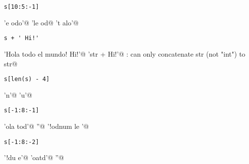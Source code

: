 \begin{ejercicio}
\begin{Verbatim}
s[10:5:-1]
\end{Verbatim}


\begin{choices}
    \choice \verb@'e odo'@
    \choice \verb@'le od@
    \choice \verb@'t alo'@
    \choice \verb@IndexError@
\end{choices}
\end{ejercicio}


\begin{ejercicio}
\begin{Verbatim}
s + ' Hi!'
\end{Verbatim}

\begin{choices}
    \choice \verb@'Hola todo el mundo! Hi!'@
    \choice \verb@'str +  Hi!'@
    \choice \verb@TypeError: can only concatenate str (not "int") to str@
    \choice \verb@False@
\end{choices}
\end{ejercicio}

\begin{ejercicio}
\begin{Verbatim}
s[len(s) - 4]
\end{Verbatim}

\begin{choices}
    \choice \verb@'n'@
    \choice \verb@'u'@
    \choice \verb@TypeError@
    \choice \verb@IndexError@
\end{choices}
\end{ejercicio}

\begin{ejercicio}
\begin{Verbatim}
s[-1:8:-1]
\end{Verbatim}

\begin{choices}
    \choice \verb@'ola tod'@
    \choice \verb@''@
    \choice \verb@'!odnum le '@
    \choice \verb@IndexError@
\end{choices}
\end{ejercicio}

\begin{ejercicio}
\begin{Verbatim}
s[-1:8:-2]
\end{Verbatim}

\begin{choices}
    \choice \verb@'!du e'@
    \choice \verb@'oatd'@
    \choice \verb@''@
    \choice \verb@IndexError@
\end{choices}
\end{ejercicio}

